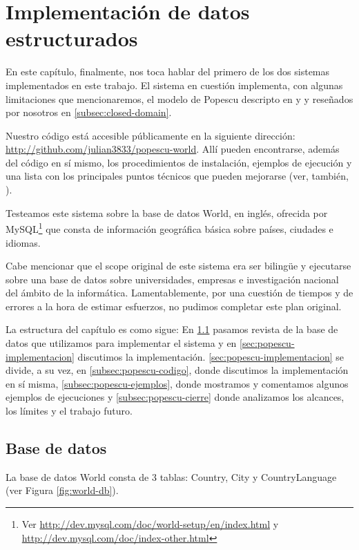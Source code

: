 \chapter{Implementación de datos estructurados}
\label{chap:4}
En este capítulo, finalmente, nos toca hablar del primero de los dos sistemas implementados en este trabajo.
El sistema en cuestión implementa, con algunas limitaciones que mencionaremos, el modelo de Popescu descripto en \cite{QADB1} y \cite{QADB2} y reseñados por nosotros en \ref{subsec:closed-domain}.

Nuestro código está accesible públicamente en la siguiente dirección: \url{http://github.com/julian3833/popescu-world}. Allí pueden encontrarse, además del código en sí mismo, los procedimientos de instalación, ejemplos de ejecución y una lista con los principales puntos técnicos que pueden mejorarse (ver, también, ).

Testeamos este sistema sobre la base de datos World, en inglés, ofrecida por MySQL\footnote{Ver \url{http://dev.mysql.com/doc/world-setup/en/index.html} y \url{http://dev.mysql.com/doc/index-other.html}} que consta de información geográfica básica sobre países, ciudades e idiomas.

Cabe mencionar que el scope original de este sistema era ser bilingüe y ejecutarse sobre una base de datos sobre universidades, empresas e investigación nacional del ámbito de la informática. Lamentablemente, por una cuestión de tiempos y de errores a la hora de estimar esfuerzos, no pudimos completar este plan original.

La estructura del capítulo es como sigue: En \ref{sec:popescu-db} pasamos revista de la base de datos que utilizamos para implementar el sistema y en \ref{sec:popescu-implementacion} discutimos la implementación. \ref{sec:popescu-implementacion} se divide, a su vez, en \ref{subsec:popescu-codigo}, donde discutimos la implementación en sí misma, \ref{subsec:popescu-ejemplos}, donde mostramos y comentamos algunos ejemplos de ejecuciones y \ref{subsec:popescu-cierre} donde analizamos los alcances, los límites y el trabajo futuro.


\section{Base de datos}
\label{sec:popescu-db}

La base de datos World consta de 3 tablas: Country, City y CountryLanguage (ver Figura \ref{fig:world-db}).

